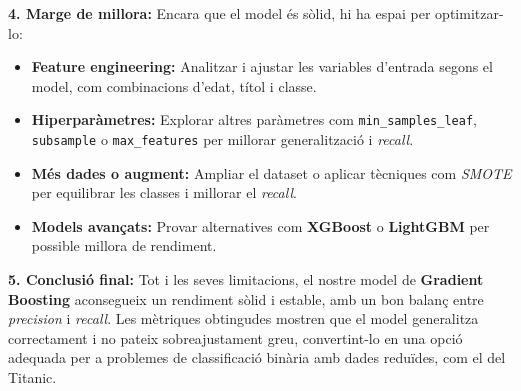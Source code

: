 \documentclass[9pt,a4paper,twoside]{tau-class/tau}
\begin{document}
\textbf{4. Marge de millora:}
Encara que el model és sòlid, hi ha espai per optimitzar-lo:

\begin{itemize}
    \item \textbf{Feature engineering:} Analitzar i ajustar les variables d’entrada segons el model, com combinacions d’edat, títol i classe.
    \item \textbf{Hiperparàmetres:} Explorar altres paràmetres com \texttt{min\_samples\_leaf}, \texttt{subsample} o \texttt{max\_features} per millorar generalització i \textit{recall}.
    \item \textbf{Més dades o augment:} Ampliar el dataset o aplicar tècniques com \textit{SMOTE} per equilibrar les classes i millorar el \textit{recall}.
    \item \textbf{Models avançats:} Provar alternatives com \textbf{XGBoost} o \textbf{LightGBM} per possible millora de rendiment.
\end{itemize}

\textbf{5. Conclusió final:}
Tot i les seves limitacions, el nostre model de \textbf{Gradient Boosting} aconsegueix un rendiment sòlid i estable, amb un bon balanç entre \textit{precision} i \textit{recall}. Les mètriques obtingudes mostren que el model generalitza correctament i no pateix sobreajustament greu, convertint-lo en una opció adequada per a problemes de classificació binària amb dades reduïdes, com el del Titanic.
\end{document}
